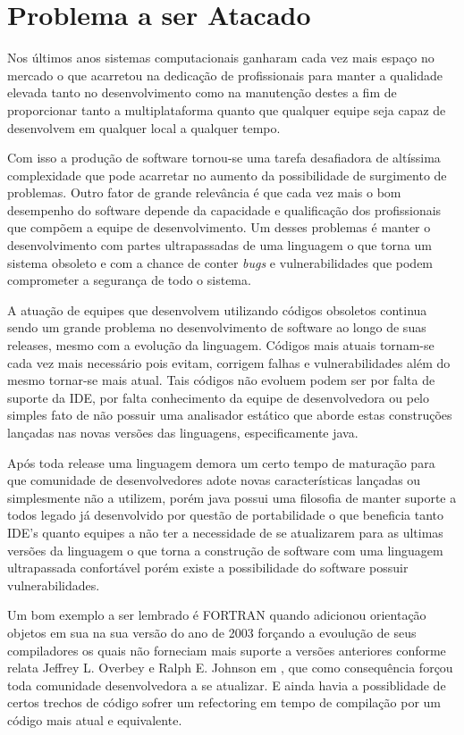 \section{Problema a ser Atacado}

Nos últimos anos sistemas computacionais ganharam cada vez mais espaço no mercado o que acarretou na dedicação de profissionais para manter a qualidade elevada tanto no desenvolvimento como na manutenção destes a fim de proporcionar tanto a multiplataforma quanto que qualquer equipe seja capaz de desenvolvem em qualquer local a qualquer tempo.

Com isso a produção de software tornou-se uma tarefa desafiadora de altíssima complexidade que pode acarretar no aumento da possibilidade de surgimento de problemas. Outro fator de grande relevância é que cada vez mais o bom desempenho do software depende da capacidade e qualificação dos profissionais que compõem a equipe de desenvolvimento. Um desses problemas é manter o desenvolvimento com partes ultrapassadas de uma linguagem o que torna um sistema obsoleto e com a chance de conter {\it bugs} e vulnerabilidades que podem comprometer a segurança de todo o sistema.


A atuação de equipes que desenvolvem utilizando códigos obsoletos continua sendo um grande problema no desenvolvimento de software ao longo de suas releases, mesmo com a evolução da linguagem. Códigos mais atuais tornam-se cada vez mais necessário pois evitam, corrigem falhas e vulnerabilidades além do mesmo tornar-se mais atual. Tais códigos não evoluem podem ser por falta de suporte da IDE, por falta conhecimento da equipe de desenvolvedora ou pelo simples fato de não possuir uma analisador estático que aborde estas construções lançadas nas novas versões das linguagens, especificamente java.


Após toda release uma linguagem demora um certo tempo de maturação para que comunidade de desenvolvedores adote novas características lançadas ou simplesmente não a utilizem, porém java possui uma filosofia de manter suporte a todos legado já desenvolvido por questão de portabilidade o que beneficia tanto IDE's quanto equipes a não ter a necessidade de se atualizarem para as ultimas versões da linguagem o que torna a construção de software com uma linguagem ultrapassada confortável porém existe a possibilidade do software possuir vulnerabilidades.

Um bom exemplo a ser lembrado é FORTRAN quando adicionou orientação objetos em sua na sua versão do ano de 2003 forçando a evoulução de seus compiladores os quais não forneciam mais suporte a versões anteriores conforme relata Jeffrey L. Overbey e Ralph E. Johnson em  \cite{Overbey:2009}, que como consequência forçou toda comunidade desenvolvedora a se atualizar. E ainda havia a possiblidade de certos trechos de código sofrer um refectoring em tempo de compilação por um código mais atual e equivalente.

